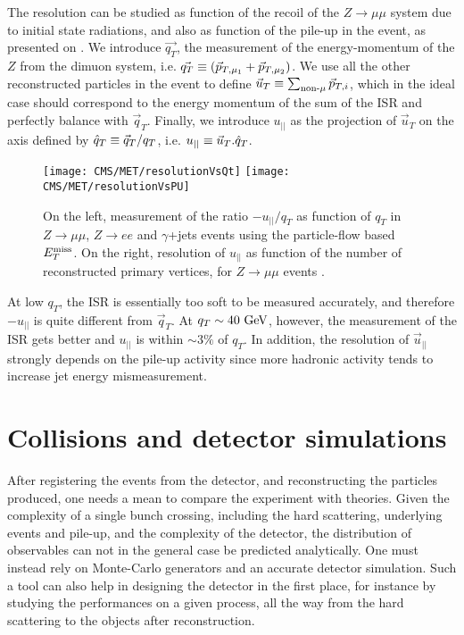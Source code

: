     The resolution can be studied as function of the recoil of the $Z
    \rightarrow \mu\mu$ system due to initial state radiations, and also as
    function of the pile-up in the event, as presented on
    . We introduce $\vec{q_T}$, the measurement of the
    energy-momentum of the $Z$ from the dimuon system, i.e.  $\vec{q_T}
    \equiv (\vec{p}_{T,\mu_1} + \vec{p}_{T,\mu_2})$. We use all the other
    reconstructed particles in the event to define $\vec{u}_T \equiv
    \sum_{\text{non-}\mu} \vec{p}_{T,i}$, which in the ideal case should
    correspond to the energy momentum of the sum of the ISR and perfectly
    balance with $\vec{q}_T$. Finally, we introduce $u_{||}$ as the projection
    of $\vec{u}_T$ on the axis defined by $\hat{q}_T \equiv \vec{q}_T /
    q_T$, i.e. $u_{||} \equiv \vec{u}_T . \hat{q}_T$.

    \begin{figure}[h!]
        \centering
        \texttt{[image: CMS/MET/resolutionVsQt]}
        \texttt{[image: CMS/MET/resolutionVsPU]}
        \caption{On the left, measurement of the ratio $-u_{||}/q_T$ as function
        of $q_T$ in $Z\rightarrow\mu\mu$, $Z\rightarrow e e$ and $\gamma$+jets
        events using the particle-flow based $E_T^\text{miss}$. On the right, resolution of
        $u_{||}$ as function of the number of reconstructed primary vertices,
        for $Z\rightarrow\mu\mu$ events \cite{METperf}.}
        \label{fig:METresolution}
    \end{figure}

    At low $q_T$, the ISR is essentially too soft to be measured accurately, and
    therefore $- u_{||}$ is quite different from $\vec{q}_T$. At $q_T \sim
    40~\text{GeV}$, however, the measurement of the ISR gets better and $u_{||}$ is
    within $\sim 3\%$ of $q_T$. In addition, the resolution of $\vec{u}_{||}$
    strongly depends on the pile-up activity since more hadronic activity tends
    to increase jet energy mismeasurement.

    \section{Collisions and detector simulations \label{sec:simu}}

    After registering the events from the detector, and reconstructing the
    particles produced, one needs a mean to compare the experiment with
    theories. Given the complexity of a single bunch crossing, including the
    hard scattering, underlying events and pile-up, and the complexity of the
    detector, the distribution of observables can not in the general case be
    predicted analytically. One must instead rely on Monte-Carlo generators and
    an accurate detector simulation.  Such a tool can also help in designing the
    detector in the first place, for instance by studying the performances on a
    given process, all the way from the hard scattering to the objects after
    reconstruction.

